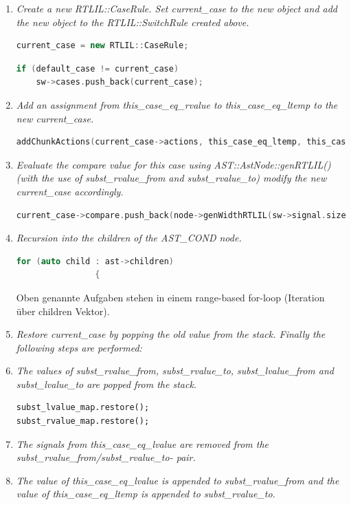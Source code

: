 \documentclass[11pt]{report}
\begin{document}
\begin{enumerate}
\item \textit{Create a new RTLIL::CaseRule. Set current\_case to the new object and add the new object to the RTLIL::SwitchRule created above.}
\begin{lstlisting}[language=C++]
current_case = new RTLIL::CaseRule;
\end{lstlisting}
\begin{lstlisting}[language=C++]
if (default_case != current_case)
	sw->cases.push_back(current_case);
\end{lstlisting}
\item \textit{Add an assignment from this\_case\_eq\_rvalue to this\_case\_eq\_ltemp to the new current\_case.}
\begin{lstlisting}[language=C++]
addChunkActions(current_case->actions, this_case_eq_ltemp, this_case_eq_rvalue);
\end{lstlisting}
\item \textit{Evaluate the compare value for this case using AST::AstNode::genRTLIL() (with the use of
subst\_rvalue\_from and subst\_rvalue\_to) modify the new current\_case accordingly.}
\begin{lstlisting}[language=C++]
current_case->compare.push_back(node->genWidthRTLIL(sw->signal.size(), &subst_rvalue_map.stdmap()));
\end{lstlisting}
\item \textit{Recursion into the children of the AST\_COND node.}
\begin{lstlisting}[language=C++]
for (auto child : ast->children)
				{
\end{lstlisting}
Oben genannte Aufgaben stehen in einem range-based for-loop (Iteration über children Vektor).
\item \textit{Restore current\_case by popping the old value from the stack.
Finally the following steps are performed:}
\item \textit{The values of subst\_rvalue\_from, subst\_rvalue\_to, subst\_lvalue\_from and subst\_lvalue\_to are popped from the stack.}
\begin{lstlisting}
subst_lvalue_map.restore();
subst_rvalue_map.restore();
\end{lstlisting}
\item \textit{The signals from this\_case\_eq\_lvalue are removed from the subst\_rvalue\_from/subst\_rvalue\_to- pair.}
\item \textit{The value of this\_case\_eq\_lvalue is appended to subst\_rvalue\_from and the value of this\_case\_eq\_ltemp is appended to subst\_rvalue\_to.}

\end{enumerate}
\end{document}
